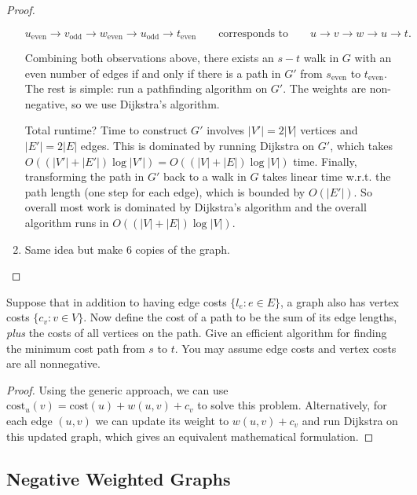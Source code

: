 \documentclass{article}
\begin{document}
\begin{proof}
\begin{enumerate}
        \[u_\text{even} \to v_\text{odd} \to w_\text{even} \to u_{\text{odd}} \to t_\text{even} \qquad \text{corresponds to}\qquad u\to v\to w \to u\to t.\]

        Combining both observations above, there exists an $s-t$ walk in $G$ with an even number of edges if and only if there is a path in $G'$ from $s_\text{even}$ to $t_\text{even}$. The rest is simple: run a pathfinding algorithm on $G'$. The weights are non-negative, so we use Dijkstra's algorithm. 

        Total runtime? Time to construct $G'$ involves $\lvert V'\rvert = 2\lvert V\lvert$ vertices and $\lvert E'\rvert = 2\lvert E\rvert$ edges. This is dominated by running Dijkstra on $G'$, which takes $O((|V'| +\lvert E'\rvert )\log \lvert V'\rvert) = O((|V|+\lvert E\rvert)\log \lvert V\rvert)$ time. Finally, transforming the path in $G'$ back to a walk in $G$ takes linear time w.r.t. the path length (one step for each edge), which is bounded by $O(\lvert E'\rvert)$.  So overall most work is dominated by Dijkstra's algorithm and the overall algorithm runs in $O((|V|+\lvert E\rvert) \log \lvert V\rvert)$.

        \item Same idea but make 6 copies of the graph. 
      \end{enumerate}
    \end{proof}

    \begin{exercise}
      Suppose that in addition to having edge costs $\{l_e:e\in E\}$, a graph also has vertex costs $\{c_v:v\in V\}$. Now define the cost of a path to be the sum of its edge lengths, \textit{plus} the costs of all vertices on the path. Give an efficient algorithm for finding the minimum cost path from $s$ to $t$. You may assume edge costs and vertex costs are all nonnegative.
    \end{exercise}
    \begin{proof}
      Using the generic approach, we can use $\text{cost}_u(v)=\text{cost}(u)+w(u,v)+c_v$ to solve this problem. Alternatively, for each edge $(u,v)$ we can update its weight to $w(u,v)+c_v$ and run Dijkstra on this updated graph, which gives an equivalent mathematical formulation.
    \end{proof}

  \subsection{Negative Weighted Graphs} 
\end{document}
